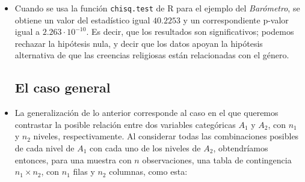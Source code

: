 \begin{itemize}
    \item Cuando se usa la función {\tt chisq.test} de R para el ejemplo del {\em Barómetro}, se obtiene un valor del estadístico igual $40.2253$ y un correspondiente p-valor igual a $2.263\cdot 10^{-10}$. Es decir, que los resultados son significativos; podemos rechazar la hipótesis nula, y decir que los datos apoyan la hipótesis alternativa de que las creencias religiosas están relacionadas con el género.


\subsection{El caso general}

    \item La generalización de lo anterior corresponde al caso en el que queremos contrastar la posible relación entre dos variables categóricas $A_1$ y $A_2$, con $n_1$ y $n_2$ niveles, respectivamente. Al considerar todas las combinaciones posibles de cada nivel de $A_1$ con cada uno de los niveles de $A_2$, obtendríamos entonces, para una muestra con $n$ observaciones,  una tabla de contingencia $n_1\times n_2$, con $n_1$ filas y $n_2$ columnas, como esta:


\end{itemize}
